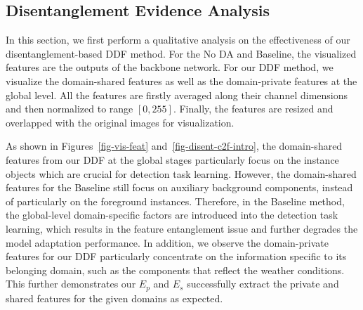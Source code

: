 \documentclass[journal]{IEEEtran}
\begin{document}
\begin{table}[!htb]
\centering
\caption{Quantitative evaluation on the domain distance under the Cityscapes $\to$ Foggy Cityscapes setting. G and I represent the features at the global and local levels, respectively.}
\label{table-cmp-distance}
\end{table}





\subsection{Disentanglement Evidence Analysis}

In this section, we first perform a qualitative analysis on the effectiveness of our disentanglement-based DDF method. For the No DA and Baseline, the visualized features are the outputs of the backbone network. For our DDF method, we visualize the domain-shared features as well as the domain-private features at the global level. All the features are firstly averaged along their channel dimensions and then normalized to range $[0,255]$. Finally, the features are resized and overlapped with the original images for visualization. {}


As shown in Figures~\ref{fig-vis-feat} and~\ref{fig-disent-c2f-intro}, the domain-shared features from our DDF at the global stages particularly focus on the instance objects which are crucial for detection task learning. However, the domain-shared features for the Baseline still focus on auxiliary background components, instead of particularly on the foreground instances. Therefore, in the Baseline method, the global-level domain-specific factors are introduced into the detection task learning, which results in the feature entanglement issue and further degrades the model adaptation performance. In addition, we observe the domain-private features for our DDF particularly concentrate on the information specific to its belonging domain, such as the components that reflect the weather conditions. This further demonstrates our $E_{p}$ and $E_{s}$ successfully extract the private and shared features for the given domains as expected.
\end{document}
